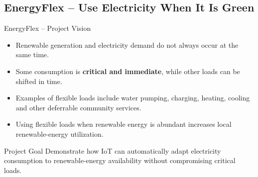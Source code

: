 \subsection{EnergyFlex -- Use Electricity When It Is Green}

\begin{frame}{EnergyFlex -- Project Vision}
\begin{itemize}
    \item Renewable generation and electricity demand do not always occur at the same time.
    \item Some consumption is \textbf{critical and immediate}, while other loads can be shifted in time.
    \item Examples of flexible loads include water pumping, charging, heating, cooling and other deferrable community services.
    \item Using flexible loads when renewable energy is abundant increases local renewable-energy utilization.
\end{itemize}

\begin{block}{Project Goal}
Demonstrate how IoT can automatically adapt electricity consumption to renewable-energy availability without compromising critical loads.
\end{block}
\end{frame}
